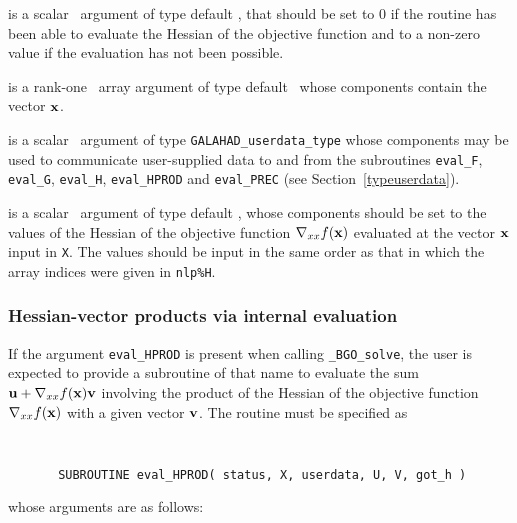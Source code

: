 \documentclass{galahad}
\newcommand{\packagename}{BGO}
\newcommand{\fullpackagename}{\libraryname\_\packagename}
\newcommand{\solver}{{\tt \fullpackagename\_solve}}
\begin{document}
\begin{description}
 is a scalar \intentout\ argument of type default \integer,
that should be set to 0 if the routine has been able to evaluate
the Hessian of the objective function
and to a non-zero value if the evaluation has not been possible.

 is a rank-one \intentin\ array argument of type default \realdp\
whose components contain the vector ${\mathbf{x}}$.

 is a scalar \intentinout\ argument of type
{\tt GALAHAD\_userdata\_type} whose components may be used
to communicate user-supplied data to and from the
subroutines {\tt eval\_F}, {\tt eval\_G},
{\tt eval\_H}, {\tt eval\_HPROD} and {\tt eval\_PREC}
(see Section~\ref{typeuserdata}).

 is a scalar \intentout\ argument of type default \realdp,
whose components should be set to the values of the Hessian
of the objective function $\nabla_{xx} f({\mathbf{x}})$
evaluated at the vector ${\mathbf{x}}$ input in {\tt X}. The values should
be input in the same order as that in which the array indices were
given in {\tt nlp\%H}.

\end{description}


\subsubsection{Hessian-vector products via internal evaluation\label{hvfv}}

If the argument {\tt eval\_HPROD} is present when calling \solver, the
user is expected to provide a subroutine of that name to evaluate the
sum ${\mathbf{u}} + \nabla_{xx} f({\mathbf{x}}) {\mathbf{v}}$ involving the
product of the Hessian of the objective function $\nabla_{xx} f({\mathbf{x}})$
with a given vector ${\mathbf{v}}$.
The routine must be specified as

\def\baselinestretch{0.8}
{\tt
\begin{verbatim}
       SUBROUTINE eval_HPROD( status, X, userdata, U, V, got_h )
\end{verbatim} }
\def\baselinestretch{1.0}
\noindent whose arguments are as follows:
\end{document}
